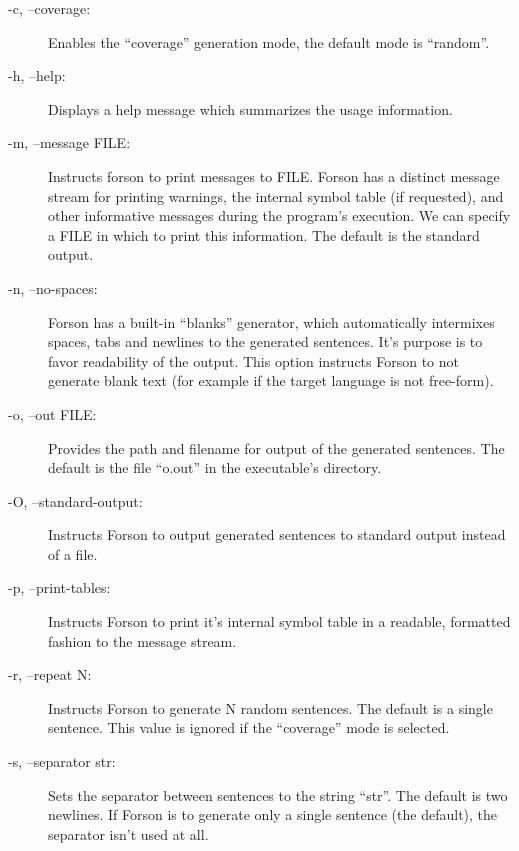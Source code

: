 \documentclass[a4paper,12pt]{article}
\begin{document}
\begin{description}
\item[-c, --coverage:]
Enables the ``coverage'' generation mode, the default mode is ``random''.

\item[-h, --help:]
Displays a help message which summarizes the usage information.

\item[-m, --message FILE:]
Instructs forson to print messages to FILE. Forson has a distinct message stream for printing warnings, the internal symbol table (if requested), and other informative messages during the program's execution. We can specify a FILE in which to print this information. The default is the standard output.

\item[-n, --no-spaces:]
Forson has a built-in ``blanks'' generator, which automatically intermixes spaces, tabs and newlines to the generated sentences. It's purpose is to favor readability of the output. This option instructs Forson to not generate blank text (for example if the target language is not free-form).

\item[-o, --out FILE:]
Provides the path and filename for output of the generated sentences. The default is the file ``o.out'' in the executable's directory.

\item[-O, --standard-output:]
Instructs Forson to output generated sentences to standard output instead of a file.

\item[-p, --print-tables:]
Instructs Forson to print it's internal symbol table in a readable, formatted fashion to the message stream.

\item[-r, --repeat N:]
Instructs Forson to generate N random sentences. The default is a single sentence. This value is ignored if the ``coverage'' mode is selected.

\item[-s, --separator str:]
Sets the separator between sentences to the string ``str''. The default is two newlines. If Forson is to generate only a single sentence (the default), the separator isn't used at all.


\end{description}
\end{document}
